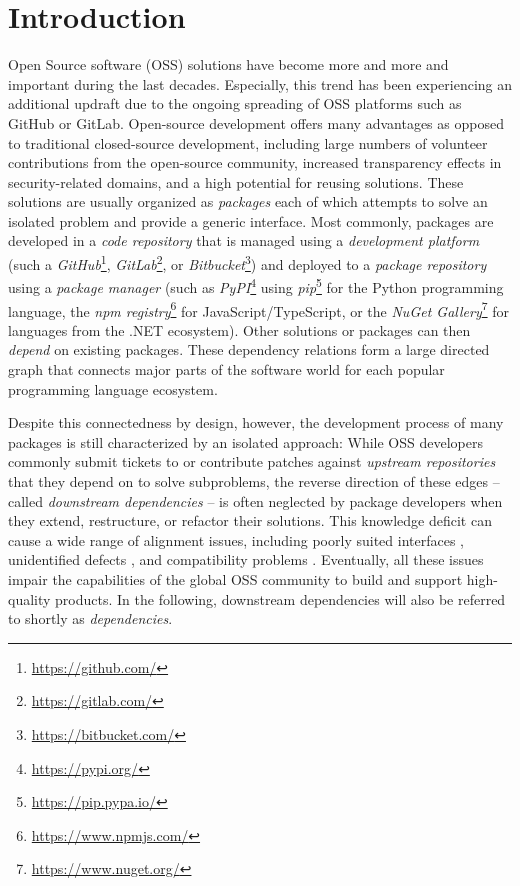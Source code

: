 \section{Introduction}
\label{sec:introduction}

Open Source software (OSS) solutions have become more and more and important during the last decades.
Especially, this trend has been experiencing an additional updraft due to the ongoing spreading of OSS platforms such as GitHub or GitLab.
Open-source development offers many advantages as opposed to traditional closed-source development, including large numbers of volunteer contributions from the open-source community, increased transparency effects in security-related domains, and a high potential for reusing solutions.
These solutions are usually organized as \emph{packages} each of which attempts to solve an isolated problem and provide a generic interface.
Most commonly, packages are developed in a \emph{code repository} that is managed using a \emph{development platform} (such a \emph{GitHub}\footnote{\url{https://github.com/}}, \emph{GitLab}\footnote{\url{https://gitlab.com/}}, or \emph{Bitbucket}\footnote{\url{https://bitbucket.com/}}) and deployed to a \emph{package repository} using a \emph{package manager} (such as \emph{PyPI}\footnote{\url{https://pypi.org/}} using \emph{pip}\footnote{\url{https://pip.pypa.io/}} for the Python programming language, the \emph{npm registry}\footnote{\url{https://www.npmjs.com/}} for JavaScript/TypeScript, or the \emph{NuGet Gallery}\footnote{\url{https://www.nuget.org/}} for languages from the .NET ecosystem).
Other solutions or packages can then \emph{depend} on existing packages.
These dependency relations form a large directed graph that connects major parts of the software world for each popular programming language ecosystem.

Despite this connectedness by design, however, the development process of many packages is still characterized by an isolated approach:
While OSS developers commonly submit tickets to or contribute patches against \emph{upstream repositories} that they depend on to solve subproblems, the reverse direction of these edges -- called \emph{downstream dependencies} -- is often neglected by package developers when they extend, restructure, or refactor their solutions.
This knowledge deficit can cause a wide range of alignment issues, including poorly suited interfaces \citep{piccioni2013empirical}, unidentified defects \citep{wong2017more}, and compatibility problems \citep{bogart2015breaks}.
Eventually, all these issues impair the capabilities of the global OSS community to build and support high-quality products.
In the following, downstream dependencies will also be referred to shortly as \emph{dependencies}.

